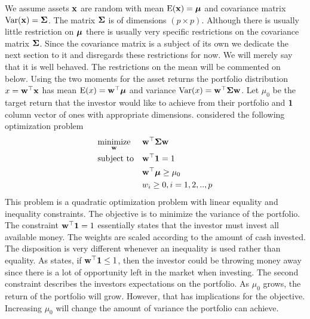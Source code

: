 \documentclass[]{book}\usepackage{knitr}
\begin{document}
We assume assets $\mathbf{x}$ are random with mean $\operatorname{E}(\mathbf{x})=\mbox{\boldmath$\mu$}$ and covariance matrix $\operatorname{Var}(\mathbf{x})=\mathbf{\Sigma}$. The matrix $\mathbf{\Sigma}$ is of dimensions $(p \times p)$. Although there is usually little restriction on $\mbox{\boldmath$\mu$}$ there is usually very specific restrictions on the covariance matrix $\mathbf{\Sigma}$. Since the covariance matrix is a subject of its own we dedicate the next section to it and disregards these restrictions for now. We will merely say that it is well behaved. The restrictions on the mean will be commented on below. Using the two moments for the asset returns the portfolio distribution $x = \mathbf{w}^\top \mathbf{x}$ has mean $\operatorname{E}(x)=\mathbf{w}^\top \mbox{\boldmath$\mu$}$ and variance $\operatorname{Var}(x)=\mathbf{w}^\top \mathbf{\Sigma} \mathbf{w}$. Let $\mu_0$ be the target return that the investor would like to achieve from their portfolio and $\mathbf{1}$ column vector of ones with appropriate dimensions. \textcite{markowitz1959portfolio} considered the following optimization problem
\begin{equation}\label{eqn:markowitz_optim}
\begin{aligned}
& \underset{\mathbf{w}}{\text{minimize}} 
& & \mathbf{w}^\top \mathbf{\Sigma} \mathbf{w} \\
& \text{subject to}
& & \mathbf{w}^\top \mathbf{1} = 1 \\
& && \mathbf{w}^\top \mbox{\boldmath$\mu$} \geq \mu_0 \\
&&& w_i \geq 0, i=1,2,..,p
\end{aligned}
\end{equation}
This problem is a quadratic optimization problem with linear equality and inequality constraints. 
The objective is to minimize the variance of the portfolio. 
The constraint $\mathbf{w}^\top \mathbf{1} = 1$ essentially states that the investor must invest all available money. 
The weights are scaled according to the amount of cash invested.
The disposition is very different whenever an inequality is used rather than equality. 
As \textcite{hult2012risk} states, if $\mathbf{w}^\top \mathbf{1} \leq 1$, then the investor could be throwing money away since there is a lot of opportunity left in the market when investing.
The second constraint describes the investors expectations on the portfolio. 
As $\mu_0$ grows, the return of the portfolio will grow. 
However, that has implications for the objective. 
Increasing $\mu_0$ will change the amount of variance the portfolio can achieve. 
\end{document}
